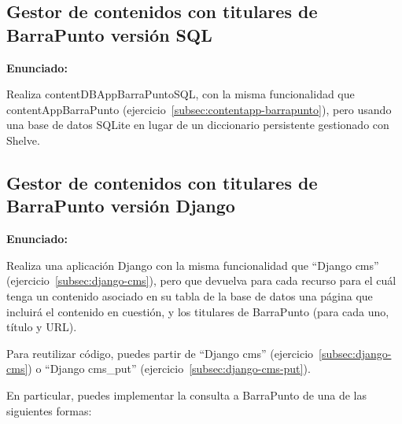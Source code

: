 \subsection{Gestor de contenidos con titulares de BarraPunto versión SQL}
\label{subsec:contentapp-barrapunto-sql}

\textbf{Enunciado:}

Realiza contentDBAppBarraPuntoSQL, con la misma funcionalidad que contentAppBarraPunto (ejercicio~\ref{subsec:contentapp-barrapunto}), pero usando una base de datos SQLite en lugar de un diccionario persistente gestionado con Shelve.

\subsection{Gestor de contenidos con titulares de BarraPunto versión Django}
\label{subsec:contentapp-barrapunto-django}

\textbf{Enunciado:}


Realiza una aplicación Django con la misma funcionalidad que ``Django cms'' (ejercicio~\ref{subsec:django-cms}), pero que devuelva para cada recurso para el cuál tenga un contenido asociado en su tabla de la base de datos una página que incluirá el contenido en cuestión, y los titulares de BarraPunto (para cada uno, título y URL).


Para reutilizar código, puedes partir de ``Django cms'' (ejercicio~\ref{subsec:django-cms}) o  ``Django cms\_put'' (ejercicio~\ref{subsec:django-cms-put}).

En particular, puedes implementar la consulta a BarraPunto de una de las siguientes formas:

